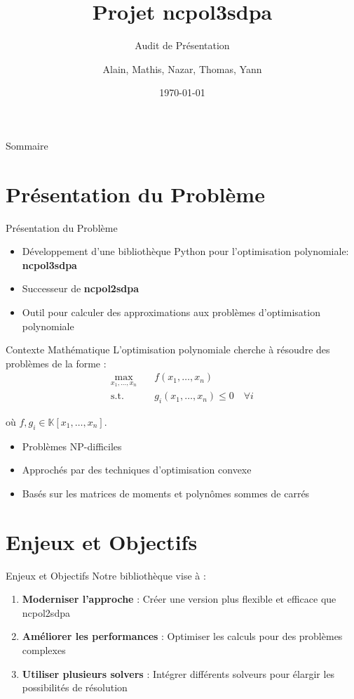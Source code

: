 \documentclass{beamer}
\title{Projet ncpol3sdpa}
\subtitle{Audit de Présentation}
\author{Alain, Mathis, Nazar, Thomas, Yann}
\date{\today}
\begin{document}
\begin{frame}
\titlepage
\end{frame}

\begin{frame}{Sommaire}
\tableofcontents
\end{frame}

\section{Présentation du Problème}

\begin{frame}{Présentation du Problème}
\begin{itemize}
    \item Développement d'une bibliothèque Python pour l'optimisation polynomiale: \textbf{ncpol3sdpa}
    \item Successeur de \textbf{ncpol2sdpa}
    \item Outil pour calculer des approximations aux problèmes d'optimisation polynomiale
\end{itemize}
\end{frame}

\begin{frame}{Contexte Mathématique}
L'optimisation polynomiale cherche à résoudre des problèmes de la forme :
\begin{align}
\max_{x_1, \ldots, x_n} &\quad f(x_1, \ldots, x_n) \\
\text{s.t.} &\quad g_i(x_1, \ldots, x_n) \leq 0 \quad \forall i
\end{align}

où $f,g_i \in \mathbb{K} [x_1,\ldots,x_n]$.
\vspace{0.5cm}

\begin{itemize}
    \item Problèmes NP-difficiles
    \item Approchés par des techniques d'optimisation convexe
    \item Basés sur les matrices de moments et polynômes sommes de carrés
\end{itemize}
\end{frame}

\section{Enjeux et Objectifs}

\begin{frame}{Enjeux et Objectifs}
Notre bibliothèque vise à :
\begin{enumerate}
    \item \textbf{Moderniser l'approche} : Créer une version plus flexible et efficace que ncpol2sdpa
    \item \textbf{Améliorer les performances} : Optimiser les calculs pour des problèmes complexes
    \item \textbf{Utiliser plusieurs solvers} : Intégrer différents solveurs pour élargir les possibilités de résolution
\end{enumerate}
\end{frame}
\end{document}
